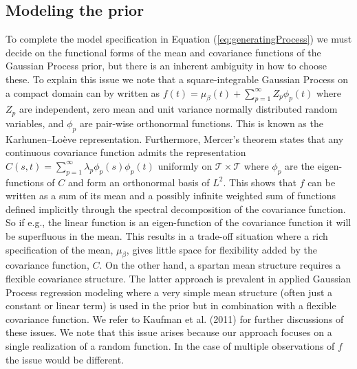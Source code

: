 \documentclass[
  11pt,
]{article}
\theoremstyle{nonumberplain}
\begin{document}
\hypertarget{sec:priorparametrization}{%
\subsection{Modeling the prior}\label{sec:priorparametrization}}

To complete the model specification in Equation
(\ref{eq:generatingProcess}) we must decide on the functional forms of
the mean and covariance functions of the Gaussian Process prior, but
there is an inherent ambiguity in how to choose these. To explain this
issue we note that a square-integrable Gaussian Process on a compact
domain can by written as
\(f(t) = \mu_{\beta}(t) + \sum_{p=1}^\infty Z_p \phi_p(t)\) where
\(Z_p\) are independent, zero mean and unit variance normally
distributed random variables, and \(\phi_p\) are pair-wise orthonormal
functions. This is known as the Karhunen--Loève representation.
Furthermore, Mercer's theorem states that any continuous covariance
function admits the representation
\(C(s,t) = \sum_{p=1}^\infty \lambda_p \phi_p(s)\phi_p(t)\) uniformly on
\(\mathcal{T} \times \mathcal{T}\) where \(\phi_p\) are the
eigen-functions of \(C\) and form an orthonormal basis of \(L^2\). This
shows that \(f\) can be written as a sum of its mean and a possibly
infinite weighted sum of functions defined implicitly through the
spectral decomposition of the covariance function. So if e.g., the
linear function is an eigen-function of the covariance function it will
be superfluous in the mean. This results in a trade-off situation where
a rich specification of the mean, \(\mu_{\beta}\), gives little space
for flexibility added by the covariance function, \(C\). On the other
hand, a spartan mean structure requires a flexible covariance structure.
The latter approach is prevalent in applied Gaussian Process regression
modeling where a very simple mean structure (often just a constant or
linear term) is used in the prior but in combination with a flexible
covariance function. We refer to Kaufman et al. (2011) for further
discussions of these issues. We note that this issue arises because our
approach focuses on a single realization of a random function. In the
case of multiple observations of \(f\) the issue would be different.
\end{document}
